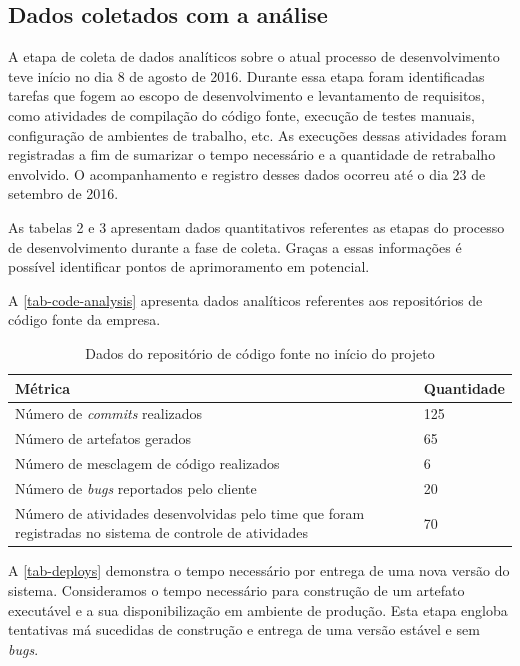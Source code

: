 \documentclass[
12pt,				%
openright,			%
oneside,			%
a4paper,			%
english,			%
french,				%
spanish,			%
brazil,				%
]{abntex2}
\begin{document}
\subsection{Dados coletados com a análise}

A etapa de coleta de dados analíticos sobre o atual processo de desenvolvimento teve início no dia 8 de agosto de 2016. Durante essa etapa foram identificadas tarefas que fogem ao escopo de desenvolvimento e levantamento de requisitos, como atividades de compilação do código fonte, execução de testes manuais, configuração de ambientes de trabalho, etc. As execuções dessas atividades foram registradas a fim de sumarizar o tempo necessário e a quantidade de retrabalho envolvido. O acompanhamento e registro desses dados ocorreu até o dia 23 de setembro de 2016.

As tabelas 2 e 3 apresentam dados quantitativos referentes as etapas do processo de desenvolvimento durante a fase de coleta. Graças a essas informações é possível identificar pontos de aprimoramento em potencial.

A \autoref{tab-code-analysis} apresenta dados analíticos referentes aos repositórios de código fonte da empresa.

\begin{table}[htb]
	\caption{Dados do repositório de código fonte no início do projeto}
	
	\label{tab-code-analysis}	
	\begin{tabular}{p{7.15cm}|p{7.10cm}}
		\textbf{Métrica} & \textbf{Quantidade}  \\
		\hline
		Número de \textit{commits} realizados & 125 \\
		\hline
		Número de artefatos gerados & 65 \\
		\hline
		Número de mesclagem de código realizados & 6 \\
		\hline
		Número de \textit{bugs} reportados pelo cliente & 20 \\
		\hline
		Número de atividades desenvolvidas pelo time que foram registradas no sistema de controle de atividades & 70 \\
	\end{tabular}
\end{table}


A \autoref{tab-deploys} demonstra o tempo necessário por entrega de uma nova versão do sistema. Consideramos o tempo necessário para construção de um artefato executável e a sua disponibilização em ambiente de produção. Esta etapa engloba tentativas má sucedidas de construção e entrega de uma versão estável e sem \textit{bugs}.
\end{document}
